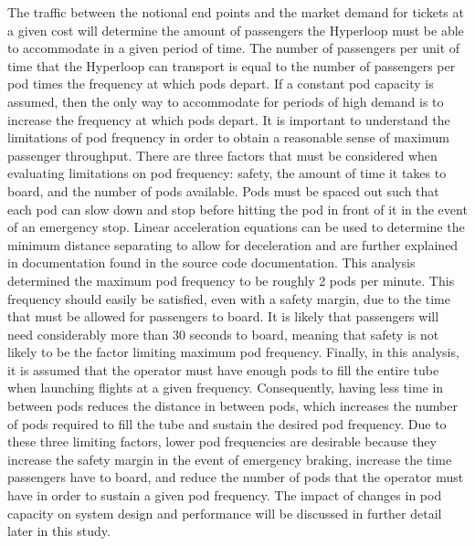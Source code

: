 The traffic between the notional end points and the market demand for tickets
at a given cost will determine the amount of passengers the Hyperloop must be
able to accommodate in a given period of time. The number of passengers per
unit of time that the Hyperloop can transport is equal to the number of
passengers per pod times the frequency at which pods depart. If a constant pod
capacity is assumed, then the only way to accommodate for periods of high
demand is to increase the frequency at which pods depart. It is important to
understand the limitations of pod frequency in order to obtain a reasonable
sense of maximum passenger throughput.
There are three factors that must be considered when evaluating limitations on
pod frequency: safety, the amount of time it takes to board, and the number of
pods available. Pods must be spaced out such that each pod can slow down and
stop before hitting the pod in front of it in the event of an emergency stop.
Linear acceleration equations can be used to determine the minimum
distance separating to allow for deceleration and are further explained in
documentation found in the source code documentation.
This analysis determined the maximum pod frequency to be roughly 2 pods per minute.
This frequency should easily be satisfied, even with a safety margin,
due to the time that must be allowed for passengers to board.
It is likely that passengers will need
considerably more than 30 seconds to board, meaning that safety is not likely
to be the factor limiting maximum pod frequency. Finally, in this analysis,
it is assumed that the operator must have enough pods to fill the entire tube
when launching flights at a given frequency. Consequently, having less time in
between pods reduces the distance in between pods, which increases the number
of pods required to fill the tube and sustain the desired pod frequency.
Due to these three limiting factors, lower pod frequencies are desirable
because they increase the safety margin in the event of emergency braking,
increase the time passengers have to board, and reduce the number of pods that
the operator must have in order to sustain a given pod frequency. The impact of
changes in pod capacity on system design and performance will be
discussed in further detail later in this study.
